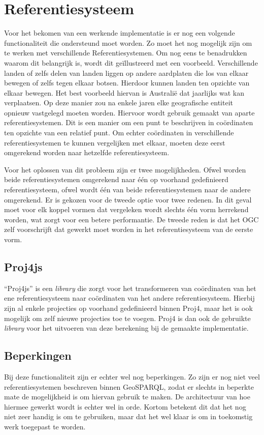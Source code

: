 \section{Referentiesysteem}
\label{sec:projecties}
Voor het bekomen van een werkende implementatie is er nog een volgende functionaliteit die ondersteund moet worden. Zo moet het nog mogelijk zijn om te werken met verschillende Referentiesystemen. Om nog eens te benadrukken waarom dit belangrijk is, wordt dit geïllustreerd met een voorbeeld. Verschillende landen of zelfs delen van landen liggen op andere aardplaten die los van elkaar bewegen of zelfs tegen elkaar botsen. Hierdoor kunnen landen ten opzichte van elkaar bewegen. Het best voorbeeld hiervan is Australië dat jaarlijks wat kan verplaatsen. Op deze manier zou na enkele jaren elke geografische entiteit opnieuw vastgelegd moeten worden. Hiervoor wordt gebruik gemaakt van aparte referentiesystemen. Dit is een manier om een punt te beschrijven in coördinaten ten opzichte van een relatief punt. Om echter coördinaten in verschillende referentiesystemen te kunnen vergelijken met elkaar, moeten deze eerst omgerekend worden naar hetzelfde referentiesysteem.

Voor het oplossen van dit probleem zijn er twee mogelijkheden. Ofwel worden beide referentiesystemen omgerekend naar één op voorhand gedefinieerd referentiesysteem, ofwel wordt één van beide referentiesystemen naar de andere omgerekend. Er is gekozen voor de tweede optie voor twee redenen. In dit geval moet voor elk koppel vormen dat vergeleken wordt slechts één vorm herrekend worden, wat zorgt voor een betere performantie. De tweede reden is dat het OGC zelf voorschrijft dat gewerkt moet worden in het referentiesysteem van de eerste vorm.

\subsection{Proj4js}
``Proj4js'' is een \textit{library} die zorgt voor het transformeren van coördinaten van het ene referentiesysteem naar coördinaten van het andere referentiesysteem. Hierbij zijn al enkele projecties op voorhand gedefinieerd binnen Proj4, maar het is ook mogelijk om zelf nieuwe projecties toe te voegen. Proj4 is dan ook de gebruikte \textit{library} voor het uitvoeren van deze berekening bij de gemaakte implementatie.

\subsection{Beperkingen}
Bij deze functionaliteit zijn er echter wel nog beperkingen. Zo zijn er nog niet veel referentiesystemen beschreven binnen GeoSPARQL, zodat er slechts in beperkte mate de mogelijkheid is om hiervan gebruik te maken. De architectuur van hoe hiermee gewerkt wordt is echter wel in orde. Kortom betekent dit dat het nog niet zeer handig is om te gebruiken, maar dat het wel klaar is om in toekomstig werk toegepast te worden.
